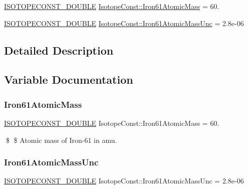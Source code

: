 \begin{DoxyCompactItemize}
\item 
\mbox{\hyperlink{group___isotope_const-_macros_ga8f45a7272ce02c0b4c65c44636ed719a}{I\+S\+O\+T\+O\+P\+E\+C\+O\+N\+S\+T\+\_\+\+D\+O\+U\+B\+LE}} \mbox{\hyperlink{group___isotope_const-_iron-_fe61_gabf3c1ece26c2c392f1750a39029ec7b1}{Isotope\+Const\+::\+Iron61\+Atomic\+Mass}} = 60.
\item 
\mbox{\hyperlink{group___isotope_const-_macros_ga8f45a7272ce02c0b4c65c44636ed719a}{I\+S\+O\+T\+O\+P\+E\+C\+O\+N\+S\+T\+\_\+\+D\+O\+U\+B\+LE}} \mbox{\hyperlink{group___isotope_const-_iron-_fe61_ga22df1ffc479a3f65eefd2256d8c2093e}{Isotope\+Const\+::\+Iron61\+Atomic\+Mass\+Unc}} = 2.\+8e-\/06
\end{DoxyCompactItemize}


\subsection{Detailed Description}


\subsection{Variable Documentation}
\mbox{\label{group___isotope_const-_iron-_fe61_gabf3c1ece26c2c392f1750a39029ec7b1}} 
\subsubsection{\texorpdfstring{Iron61\+Atomic\+Mass}{Iron61AtomicMass}}
{\footnotesize\ttfamily \mbox{\hyperlink{group___isotope_const-_macros_ga8f45a7272ce02c0b4c65c44636ed719a}{I\+S\+O\+T\+O\+P\+E\+C\+O\+N\+S\+T\+\_\+\+D\+O\+U\+B\+LE}} Isotope\+Const\+::\+Iron61\+Atomic\+Mass = 60.}

\$ \$ Atomic mass of Iron-\/61 in amu. \mbox{\label{group___isotope_const-_iron-_fe61_ga22df1ffc479a3f65eefd2256d8c2093e}} 
\subsubsection{\texorpdfstring{Iron61\+Atomic\+Mass\+Unc}{Iron61AtomicMassUnc}}
{\footnotesize\ttfamily \mbox{\hyperlink{group___isotope_const-_macros_ga8f45a7272ce02c0b4c65c44636ed719a}{I\+S\+O\+T\+O\+P\+E\+C\+O\+N\+S\+T\+\_\+\+D\+O\+U\+B\+LE}} Isotope\+Const\+::\+Iron61\+Atomic\+Mass\+Unc = 2.\+8e-\/06}

